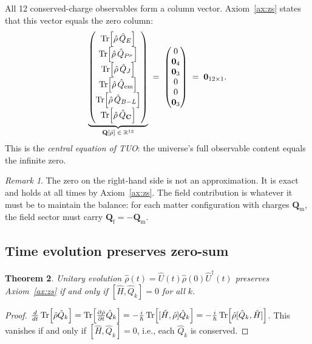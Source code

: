 \documentclass[12pt,a4paper]{article}
\newtheorem{theorem}{Theorem}[section]
\theoremstyle{definition}
\theoremstyle{remark}
\newtheorem{remark}[theorem]{Remark}
\newcommand{\rhohat}{\hat{\rho}}
\newcommand{\Qhat}{\hat{Q}}
\newcommand{\Hhat}{\hat{H}}
\begin{document}
All 12 conserved-charge observables form a column vector.
Axiom~\ref{ax:zs} states that this vector equals the zero column:
\begin{equation}\label{eq:full_zero}
  \underbrace{
  \begin{pmatrix}
    \Tr[\rhohat\,\Qhat_E] \\[2pt]
    \Tr[\rhohat\,\Qhat_{P^{\mu}}] \\[2pt]
    \Tr[\rhohat\,\Qhat_{J}] \\[2pt]
    \Tr[\rhohat\,\Qhat_{\mathrm{em}}] \\[2pt]
    \Tr[\rhohat\,\Qhat_{B-L}] \\[2pt]
    \Tr[\rhohat\,\Qhat_{\mathbf{C}}]
  \end{pmatrix}}_{\mathbf{Q}[\rhohat]\;\in\;\mathbb{R}^{12}}
  \;=\;
  \begin{pmatrix}0 \\ \mathbf{0}_4 \\ \mathbf{0}_3 \\ 0 \\ 0 \\ \mathbf{0}_3 \end{pmatrix}
  \;=\;\mathbf{0}_{12\times 1}.
\end{equation}
This is the \emph{central equation of TUO}:
the universe's full observable content equals the infinite zero.

\begin{remark}
The zero on the right-hand side is not an approximation.
It is exact and holds at all times by Axiom~\ref{ax:zs}.
The field contribution is whatever it must be to maintain the balance:
for each matter configuration with charges $\mathbf{Q}_\mathrm{m}$, the
field sector must carry $\mathbf{Q}_\mathrm{f} = -\mathbf{Q}_\mathrm{m}$.
\end{remark}

\subsection{Time evolution preserves zero-sum}

\begin{theorem}\label{thm:liouville}
Unitary evolution $\rhohat(t) = \hat{U}(t)\rhohat(0)\hat{U}^\dagger(t)$
preserves Axiom~\ref{ax:zs} if and only if $[\Hhat, \Qhat_k] = 0$ for all $k$.
\end{theorem}
\begin{proof}
$\frac{d}{dt}\Tr[\rhohat\Qhat_k]
 = \Tr\!\left[\frac{\partial\rhohat}{\partial t}\Qhat_k\right]
 = -\frac{i}{\hbar}\Tr[[\Hhat,\rhohat]\Qhat_k]
 = -\frac{i}{\hbar}\Tr[\rhohat[\Qhat_k,\Hhat]]$.
This vanishes if and only if $[\Hhat,\Qhat_k] = 0$, i.e., each $\Qhat_k$
is conserved.
\end{proof}
\end{document}
